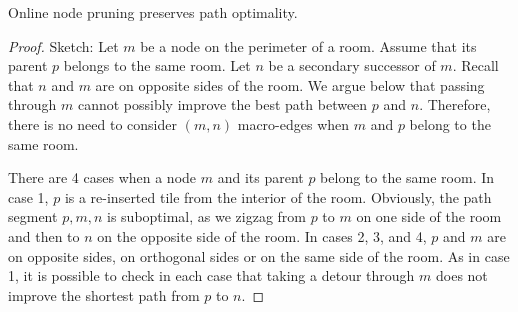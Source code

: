 \begin{lemma}
Online node pruning preserves path optimality.
\end{lemma}
\begin{proof}
Sketch:
Let $m$ be a node on the perimeter of a room. Assume that its parent $p$ belongs
to the same room.
Let $n$ be a secondary successor of $m$.
Recall that $n$ and $m$ are on opposite sides of the room.
We argue below that passing through $m$ cannot possibly improve the 
best path between $p$ and $n$.
Therefore, there is no need to consider $(m,n)$ macro-edges
when $m$ and $p$ belong to the same room.

There are 4 cases when a node $m$ and its parent $p$ belong to the
same room. In case 1, $p$ is a re-inserted tile from the interior of the room. 
Obviously, the path segment $p,m,n$ is suboptimal, as we zigzag from $p$ to $m$
on one side of the room and then to $n$ on the opposite
side of the room.
In cases 2, 3, and 4, $p$ and $m$ are on opposite sides, on orthogonal sides or 
on the same side of the room. As in case 1, it is possible to check in each case that
taking a detour through $m$ does not improve the shortest path from $p$ to $n$.
\end{proof}




